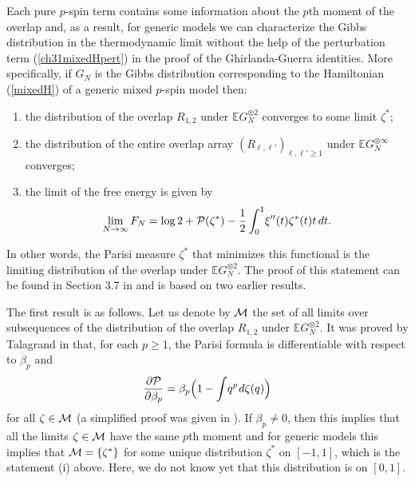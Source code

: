 \documentclass[12pt]{article}
\newcommand{\M}{{\cal M}}
\newcommand{\PP}{{\cal P}}
\newcommand{\smsp}{\hspace{0.3mm}}
\newcommand{\e}{\mathbb{E}}
\theoremstyle{nonumberplain}
\begin{document}
\medskip
\noindent
Each pure $p$-spin term contains some information about the $p$th moment of the overlap and, as a result, for generic models we can characterize the Gibbs distribution in the thermodynamic limit without the help of the perturbation term (\ref{ch31mixedHpert}) in the proof of the Ghirlanda-Guerra identities. More specifically, if $G_N$ is the Gibbs distribution corresponding to the Hamiltonian (\ref{mixedH}) of a generic mixed $p$-spin model then:
\begin{enumerate}
\item[(i)] the distribution of the overlap $R_{1,2}$ under $\e G_N^{\otimes 2}$ converges to some limit $\zeta^*$;

\item[(ii)] the distribution of the entire overlap array $(R_{\ell,\ell'})_{\ell,\ell'\geq 1}$ under $\e G_N^{\otimes \infty}$ converges;

\item[(iii)] the limit of the free energy is given by 
$$
\lim_{N\to\infty} F_N = 
\log 2 + \PP(\zeta^*) -\frac{1}{2}\int_{0}^{1}\! \xi''(t)\zeta^*(t)t\, dt.
$$
\end{enumerate}
In other words, the Parisi measure $\zeta^*$ that minimizes this functional is the limiting distribution of the overlap under $\e G_N^{\otimes 2}$. The proof of this statement can be found in Section 3.7 in \cite{SKmodel} and is based on two earlier results.

The first result is as follows. Let us denote by $\M$ the set of all limits over subsequences of the distribution of the overlap $R_{1,2}$ under $\e G_N^{\otimes 2}$. It was proved by Talagrand in \cite{PM} that, for each $p\geq 1$, the Parisi formula is differentiable with respect to  $\beta_p$ and 
\begin{equation}
\frac{\partial \PP}{\partial \beta_p} = 
\beta_p\Bigl(1-\int\! q^p \smsp d\zeta(q) \Bigr)
\label{ch36derP}
\end{equation}
for all $\zeta\in \M$ (a simplified proof was given in \cite{ECPs}). If $\beta_p \not = 0$, then this implies that all the limits $\zeta\in \M$ have the same $p$th moment and for generic models this implies that $\M = \{\zeta^*\}$ for some unique distribution $\zeta^*$ on $[-1,1]$, which is the statement (i) above. Here, we do not know yet that this distribution is on $[0,1]$. 
\end{document}
